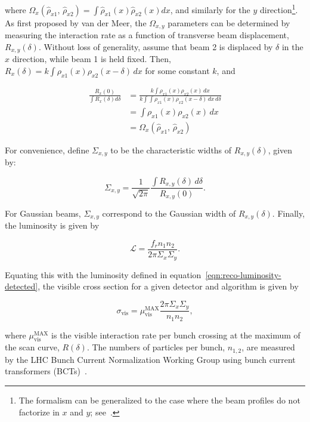 where $\Omega_x(\hat{\rho}_{x1},\,\hat{\rho}_{x2})=\int \hat{\rho}_{x1}(x) \hat{\rho}_{x2}(x) dx$, and similarly for the $y$ direction\footnote{The formalism can be generalized to the case where the beam profiles do not factorize in $x$ and $y$; see~\cite{Balagura:2011er}.}. As first proposed by van der Meer, the $\Omega_{x,y}$ parameters can be determined by measuring the interaction rate as a function of transverse beam displacement, $R_{x,y}(\delta)$. Without loss of generality, assume that beam 2 is displaced by $\delta$ in the $x$ direction, while beam 1 is held fixed. Then, $R_{x}(\delta) = k \int \rho_{x1}(x) \rho_{x2}(x-\delta)\, dx$ for some constant $k$, and 

\begin{align}
	\frac{R_x(0)}{\int R_x(\delta) d\delta} &= \frac{k\int \rho_{x1}(x) \rho_{x2}(x)\, dx}{k\int\int \rho_{x1}(x)\rho_{x2}(x-\delta) \, dx\, d\delta} \\
	&= \int \rho_{x1}(x)\rho_{x2}(x)\, dx \\
	&= \Omega_x (\hat{\rho}_{x1},\,\hat{\rho}_{x2})
\end{align}

For convenience, define $\Sigma_{x,y}$ to be the characteristic widths of $R_{x,y}(\delta)$, given by:

\begin{equation}\label{eqn:reco-luminosity-CapSigma}
	\Sigma_{x,y}=\frac{1}{\sqrt{2\pi}} \frac{\int R_{x,y}(\delta)\,d\delta}{R_{x,y}(0)}.
\end{equation}

For Gaussian beams, $\Sigma_{x,y}$ correspond to the Gaussian width of $R_{x,y}(\delta)$. Finally, the luminosity is given by

\begin{equation}
	\mathcal{L} = \frac{f_r n_1 n_2}{2\pi \Sigma_x \Sigma_y}.
\end{equation}

Equating this with the luminosity defined in equation~\ref{eqn:reco-luminosity-detected}, the visible cross section for a given detector and algorithm is given by

\begin{equation}
	\sigma_{\mathrm{vis}} = \mu_{\mathrm{vis}}^{\mathrm{MAX}} \frac{2\pi \Sigma_x \Sigma_y}{n_1 n_2},
\end{equation}

where $\mu_{\mathrm{vis}}^{\mathrm{MAX}}$ is the visible interaction rate per bunch crossing at the maximum of the scan curve, $R(\delta)$. The numbers of particles per bunch, $n_{1,2}$, are measured by the LHC Bunch Current Normalization Working Group using bunch current transformers (BCTs)~\cite{Barschel:1425904,Anders:1427726,Alici:1427728}. 

